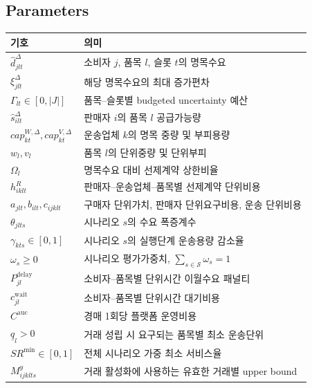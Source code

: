 \documentclass[11pt,a4paper]{article}
\newcommand{\Scen}{\mathcal{S}}
\begin{document}
\subsection{Parameters}
\begin{longtable}{@{}p{}p{}@{}}
\toprule
기호 & 의미 \\
\midrule
$\hat d^{\Delta}_{jlt}$ & 소비자 $j$, 품목 $l$, 슬롯 $t$의 명목수요 \\
$\xi^{\Delta}_{jlt}$ & 해당 명목수요의 최대 증가편차 \\
$\Gamma_{lt}\in[0,|J|]$ & 품목--슬롯별 budgeted uncertainty 예산 \\
$\hat s^{\Delta}_{ilt}$ & 판매자 $i$의 품목 $l$ 공급가능량 \\
$cap^{W,\Delta}_{kt},cap^{V,\Delta}_{kt}$ & 운송업체 $k$의 명목 중량 및 부피용량 \\
$w_l,v_l$ & 품목 $l$의 단위중량 및 단위부피 \\
$\Omega_l$ & 명목수요 대비 선제계약 상한비율 \\
$h^R_{iklt}$ & 판매자--운송업체--품목별 선제계약 단위비용 \\
$a_{jlt},b_{ilt},c_{ijklt}$ & 구매자 단위가치, 판매자 단위요구비용, 운송 단위비용 \\
$\theta_{jlts}$ & 시나리오 $s$의 수요 폭증계수 \\
$\gamma_{kts}\in[0,1]$ & 시나리오 $s$의 실행단계 운송용량 감소율 \\
$\omega_s\ge0$ & 시나리오 평가가중치, $\sum_{s\in\Scen}\omega_s=1$ \\
$P^{\mathrm{delay}}_{jl}$ & 소비자--품목별 단위시간 이월수요 패널티 \\
$c^{\mathrm{wait}}_{jl}$ & 소비자--품목별 단위시간 대기비용 \\
$C^{\mathrm{auc}}$ & 경매 1회당 플랫폼 운영비용 \\
$\underline q_l>0$ & 거래 성립 시 요구되는 품목별 최소 운송단위 \\
$SR^{\min}\in[0,1]$ & 전체 시나리오 가중 최소 서비스율 \\
$M^y_{ijklts}$ & 거래 활성화에 사용하는 유효한 거래별 upper bound \\
\bottomrule
\end{longtable}
\end{document}
